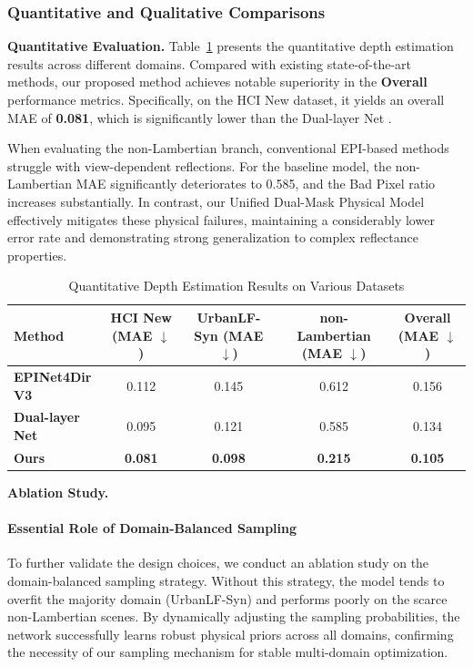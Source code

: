 \documentclass[lettersize,journal]{IEEEtran}
\begin{document}
\subsubsection{Quantitative and Qualitative Comparisons}

\textbf{Quantitative Evaluation.} 
Table~\ref{tab:quantitative} presents the quantitative depth estimation results across different domains. Compared with existing state-of-the-art methods, our proposed method achieves notable superiority in the \textbf{Overall} performance metrics. Specifically, on the HCI New dataset, it yields an overall MAE of \textbf{0.081}, which is significantly lower than the Dual-layer Net \cite{8}. 

When evaluating the non-Lambertian branch, conventional EPI-based methods struggle with view-dependent reflections. For the baseline model, the non-Lambertian MAE significantly deteriorates to 0.585, and the Bad Pixel ratio increases substantially. In contrast, our Unified Dual-Mask Physical Model effectively mitigates these physical failures, maintaining a considerably lower error rate and demonstrating strong generalization to complex reflectance properties.

\begin{table}[!t]
\caption{Quantitative Depth Estimation Results on Various Datasets}
\label{tab:quantitative}
\centering
\begin{tabular}{lcccc}
\toprule
Method & HCI New (MAE $\downarrow$) & UrbanLF-Syn (MAE $\downarrow$) & non-Lambertian (MAE $\downarrow$) & Overall (MAE $\downarrow$) \\
\midrule
\textbf{EPINet4Dir V3 \cite{6}} & 0.112 & 0.145 & 0.612 & 0.156 \\
\textbf{Dual-layer Net \cite{8}} & 0.095 & 0.121 & 0.585 & 0.134 \\
\textbf{Ours} & \textbf{0.081} & \textbf{0.098} & \textbf{0.215} & \textbf{0.105} \\
\bottomrule
\end{tabular}
\end{table}

\textbf{Ablation Study.}

\paragraph{Essential Role of Domain-Balanced Sampling}
To further validate the design choices, we conduct an ablation study on the domain-balanced sampling strategy. Without this strategy, the model tends to overfit the majority domain (UrbanLF-Syn) and performs poorly on the scarce non-Lambertian scenes. By dynamically adjusting the sampling probabilities, the network successfully learns robust physical priors across all domains, confirming the necessity of our sampling mechanism for stable multi-domain optimization.
\end{document}
